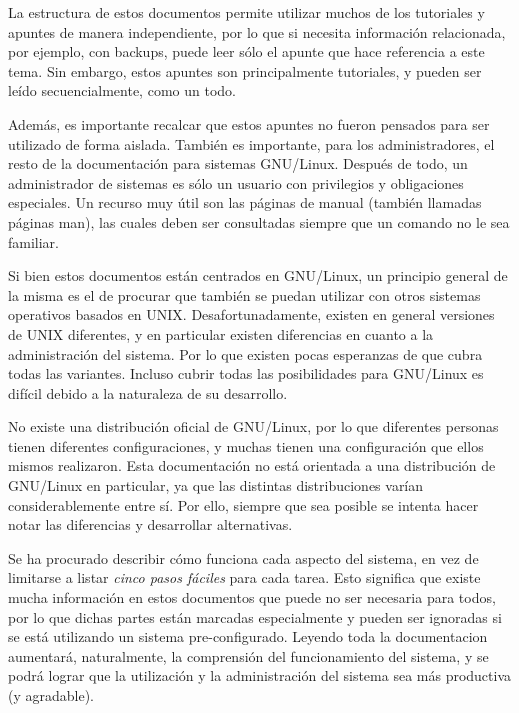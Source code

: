\documentclass[12pt]{article}
\begin{document}
\begin{}
La estructura de estos documentos permite utilizar muchos de los tutoriales y apuntes
de manera independiente, por lo que si necesita información relacionada, por ejemplo,
con backups, 
puede leer sólo el apunte que hace referencia a este tema. 
Sin embargo, estos apuntes son principalmente tutoriales,
y pueden ser leído secuencialmente, como un todo.

Además, es importante recalcar que estos apuntes no fueron
pensados para ser utilizado de forma aislada. También
es importante, para los administradores, el resto de la documentación
para sistemas GNU/Linux. Después de todo, un administrador de sistemas es sólo
un usuario con privilegios y obligaciones especiales. Un recurso muy útil son
las páginas de manual (también llamadas páginas man), las cuales deben ser
consultadas siempre que un comando no le sea familiar.  

Si bien estos documentos están centrados en GNU/Linux, un principio general de la
misma es el de procurar que también se puedan utilizar con otros sistemas
operativos basados en UNIX. Desafortunadamente, existen en
general versiones de UNIX diferentes, y en
particular existen diferencias en cuanto a la administración del sistema. 
Por lo que existen pocas esperanzas de que
cubra todas las variantes. Incluso cubrir todas las posibilidades para GNU/Linux
es difícil debido a la naturaleza de su desarrollo.  

No existe una distribución oficial de GNU/Linux, por lo que diferentes
personas tienen diferentes configuraciones, y muchas tienen una configuración
que ellos mismos realizaron. Esta documentación no está orientada a una distribución de
GNU/Linux en particular, ya que las distintas distribuciones varían
considerablemente entre sí. Por ello, siempre que sea posible se intenta hacer
notar las diferencias y desarrollar alternativas.

Se ha procurado describir cómo funciona cada aspecto del sistema, en vez
de limitarse a listar \textit{cinco pasos fáciles} para cada tarea. Esto significa que
existe
mucha información en estos documentos que puede no ser necesaria para todos, por lo
que dichas partes están marcadas especialmente y pueden ser
ignoradas si se está utilizando un sistema pre-configurado. Leyendo toda la documentacion
aumentará, naturalmente, la comprensión del funcionamiento del sistema, y se
podrá lograr que la utilización y la administración del sistema sea más
productiva (y agradable).


\end{}
\end{document}
